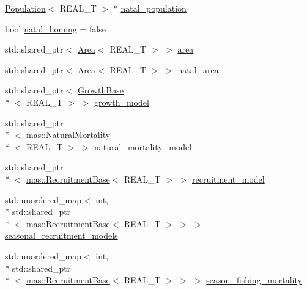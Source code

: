 \begin{DoxyCompactItemize}
\hyperlink{classmas_1_1_population}{Population}$<$ R\-E\-A\-L\-\_\-\-T $>$ $\ast$ \hyperlink{structmas_1_1_area_population_info_ad4e0348af8d76c0eb5d7ba8120186f78}{natal\-\_\-population}
\item 
bool \hyperlink{structmas_1_1_area_population_info_a9127961ba1b99fbf6f55a00d05eadff4}{natal\-\_\-homing} = false
\item 
std\-::shared\-\_\-ptr$<$ \hyperlink{structmas_1_1_area}{Area}$<$ R\-E\-A\-L\-\_\-\-T $>$ $>$ \hyperlink{structmas_1_1_area_population_info_a6f1983de42fde246cfc0381467ca7213}{area}
\item 
std\-::shared\-\_\-ptr$<$ \hyperlink{structmas_1_1_area}{Area}$<$ R\-E\-A\-L\-\_\-\-T $>$ $>$ \hyperlink{structmas_1_1_area_population_info_a04927ec6ccc6dd7ef32b795c9511f268}{natal\-\_\-area}
\item 
std\-::shared\-\_\-ptr$<$ \hyperlink{structmas_1_1_growth_base}{Growth\-Base}\\*
$<$ R\-E\-A\-L\-\_\-\-T $>$ $>$ \hyperlink{structmas_1_1_area_population_info_a1b4170de0de0fb71776f3b4beb6e19a8}{growth\-\_\-model}
\item 
std\-::shared\-\_\-ptr\\*
$<$ \hyperlink{structmas_1_1_natural_mortality}{mas\-::\-Natural\-Mortality}\\*
$<$ R\-E\-A\-L\-\_\-\-T $>$ $>$ \hyperlink{structmas_1_1_area_population_info_a313b0e5b00579750cebccc55fc177ffa}{natural\-\_\-mortality\-\_\-model}
\item 
std\-::shared\-\_\-ptr\\*
$<$ \hyperlink{structmas_1_1_recruitment_base}{mas\-::\-Recruitment\-Base}$<$ R\-E\-A\-L\-\_\-\-T $>$ $>$ \hyperlink{structmas_1_1_area_population_info_a59e658dc82c72ae21f3b52d84ad5ec25}{recruitment\-\_\-model}
\item 
std\-::unordered\-\_\-map$<$ int, \\*
std\-::shared\-\_\-ptr\\*
$<$ \hyperlink{structmas_1_1_recruitment_base}{mas\-::\-Recruitment\-Base}$<$ R\-E\-A\-L\-\_\-\-T $>$ $>$ $>$ \hyperlink{structmas_1_1_area_population_info_a55b58b150ddfdd74d09247c2537a2d08}{seasonal\-\_\-recruitment\-\_\-models}
\item 
std\-::unordered\-\_\-map$<$ int, \\*
std\-::shared\-\_\-ptr\\*
$<$ \hyperlink{structmas_1_1_recruitment_base}{mas\-::\-Recruitment\-Base}$<$ R\-E\-A\-L\-\_\-\-T $>$ $>$ $>$ \hyperlink{structmas_1_1_area_population_info_a1f60363498c8044b38d34519e3a26d6c}{season\-\_\-fishing\-\_\-mortality}

\end{DoxyCompactItemize}
